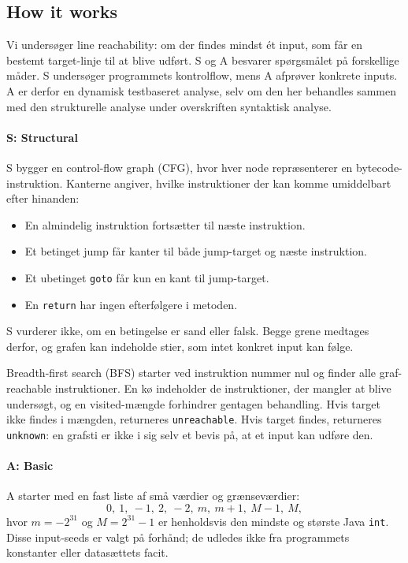 

\subsection{How it works}
Vi unders{\o}ger line reachability: om der findes mindst \'et input, som
f{\aa}r en bestemt target-linje til at blive udf{\o}rt. S og A besvarer
sp{\o}rgsm{\aa}let p{\aa} forskellige m{\aa}der. S unders{\o}ger programmets
kontrolflow, mens A afpr{\o}ver konkrete inputs. A er derfor en dynamisk
testbaseret analyse, selv om den her behandles sammen med den strukturelle
analyse under overskriften syntaktisk analyse.

\paragraph{S: Structural}
S bygger en control-flow graph (CFG), hvor hver node repr{\ae}senterer en
bytecode-instruktion. Kanterne angiver, hvilke instruktioner der kan komme
umiddelbart efter hinanden:
\begin{itemize}
    \item En almindelig instruktion forts{\ae}tter til n{\ae}ste instruktion.
    \item Et betinget jump f{\aa}r kanter til b{\aa}de jump-target og n{\ae}ste
          instruktion.
    \item Et ubetinget \texttt{goto} f{\aa}r kun en kant til jump-target.
    \item En \texttt{return} har ingen efterf{\o}lgere i metoden.
\end{itemize}
S vurderer ikke, om en betingelse er sand eller falsk. Begge grene medtages
derfor, og grafen kan indeholde stier, som intet konkret input kan f{\o}lge.

Breadth-first search (BFS) starter ved instruktion nummer nul og finder alle
graf-reachable instruktioner. En k{\o} indeholder de instruktioner, der mangler
at blive unders{\o}gt, og en visited-m{\ae}ngde forhindrer gentagen behandling.
Hvis target ikke findes i m{\ae}ngden, returneres \texttt{unreachable}.
Hvis target findes, returneres \texttt{unknown}: en grafsti er ikke i sig
selv et bevis p{\aa}, at et input kan udf{\o}re den.

\paragraph{A: Basic}
A starter med en fast liste af sm{\aa} v{\ae}rdier og gr{\ae}nsev{\ae}rdier:
\[
0,\ 1,\ -1,\ 2,\ -2,\ m,\ m+1,\ M-1,\ M,
\]
hvor $m=-2^{31}$ og $M=2^{31}-1$ er henholdsvis den mindste og st{\o}rste
Java \texttt{int}. Disse input-seeds er valgt p{\aa} forh{\aa}nd; de udledes
ikke fra programmets konstanter eller datas{\ae}ttets facit.

